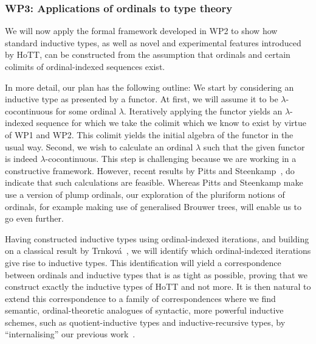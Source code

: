\documentclass[a4paper,11pt]{article}
\let\oldcite\cite
\renewcommand*\cite[1]{{\protect\NoHyper\oldcite{#1}\protect\endNoHyper}}
\begin{document}
\subsubsection*{WP3: Applications of ordinals to type theory}
\vspace*{-0.25em}
We will now apply the formal framework developed in WP2 to show how standard inductive types, as well as novel and experimental features introduced by HoTT, can be constructed from the assumption that ordinals and certain colimits of ordinal-indexed sequences exist.

In more detail, our plan has the following outline:
We start by considering an inductive type as presented by a functor. At first, we will assume it to be \(\lambda\)-cocontinuous for some ordinal \(\lambda\).
Iteratively applying the functor yields an \(\lambda\)-indexed sequence for which we take the colimit which we know to exist by virtue of WP1 and WP2. This colimit yields the initial algebra of the functor in the usual way.
%
%
Second, we wish to calculate an ordinal \(\lambda\) such that the given functor is indeed \(\lambda\)-cocontinuous. This step is challenging because we are working in a constructive framework. However, recent results by Pitts and Steenkamp~\cite{PittsSteenkamp2022}, do indicate that such calculations are feasible.
%
Whereas Pitts and Steenkamp make use a version of plump ordinals, our exploration of the pluriform notions of ordinals, for example making use of generalised Brouwer trees, will enable us to go even further.

Having constructed inductive types using ordinal-indexed iterations, and building on a classical result by Trnkov\'a~\cite{AdamekMiliusMoss2018}, we will identify which ordinal-indexed iterations give rise to inductive types. %
This identification will yield a correspondence between ordinals and inductive types that is as tight as possible, proving that we construct exactly the inductive types of HoTT and not more.
%
It is then natural to extend this correspondence to a family of correspondences where we find semantic, ordinal-theoretic analogues of syntactic, more powerful inductive schemes, such as quotient-inductive types and inductive-recursive types, by ``internalising'' our previous work~\cite{Altenkirch2018,fibredData}.
\end{document}

